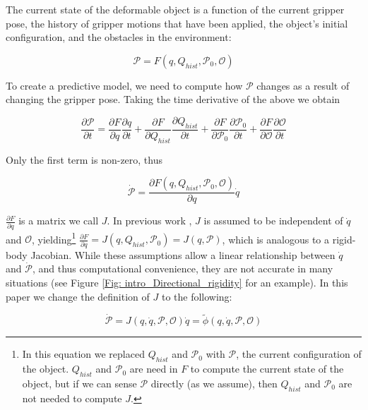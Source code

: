 The current state of the deformable object is a function of the current gripper pose, the history of gripper motions that have been applied, the object's initial configuration, and the obstacles in the environment:

\begin{equation}
    \mathcal{P} = F(q, Q_{hist},\mathcal{P}_0,\mathcal{O})
\end{equation}

To create a predictive model, we need to compute how $\mathcal{P}$ changes as a result of changing the gripper pose. Taking the time derivative of the above we obtain

\begin{equation}
\frac{\partial \mathcal{P}}{\partial t} = \frac{\partial F}{\partial q} \frac{\partial q}{\partial t} + \frac{\partial F}{\partial Q_{hist} } \frac{\partial Q_{hist}}{\partial t}+\frac{\partial F}{\partial \mathcal{P}_0} \frac{\partial \mathcal{P}_0}{\partial t} +\frac{\partial F}{\partial \mathcal{O}} \frac{\partial \mathcal{O}}{\partial t} \end{equation}

\noindent Only the first term is non-zero, thus

\begin{equation}
    \dot{\mathcal{P}} = \frac{\partial F(q, Q_{hist},\mathcal{P}_0,\mathcal{O})}{\partial q} \dot{q}%
\end{equation}

$\frac{\partial F}{\partial q}$ is a matrix we call $J$. In previous work \cite{Berenson2013}, $J$ is assumed to be independent of $\dot{q}$ and $\mathcal{O}$, yielding\footnote{In this equation we replaced $Q_{hist}$ and $\mathcal{P}_0$ with $\mathcal{P}$, the current configuration of the object. $Q_{hist}$ and $\mathcal{P}_0$ are need in $F$ to compute the current state of the object, but if we can sense $\mathcal{P}$ directly (as we assume), then $Q_{hist}$ and $\mathcal{P}_0$ are not needed to compute $J$.} $\frac{\partial F}{\partial q} = J(q,Q_{hist},\mathcal{P}_0) = J(q,\mathcal{P})$, which is analogous to a rigid-body Jacobian. While these assumptions allow a linear relationship between $\dot{q}$ and $\dot{\mathcal{P}}$, and thus computational convenience, they are not accurate in many situations (see Figure \ref{Fig: intro_Directional_rigidity} for an example). In this paper we change the definition of $J$ to the following:

\begin{equation}
    \dot{\mathcal{P}} = J(q,\dot{q},\mathcal{P},\mathcal{O})\dot{q} = \tilde{\phi}(q,\dot{q},\mathcal{P},\mathcal{O})
\end{equation}

